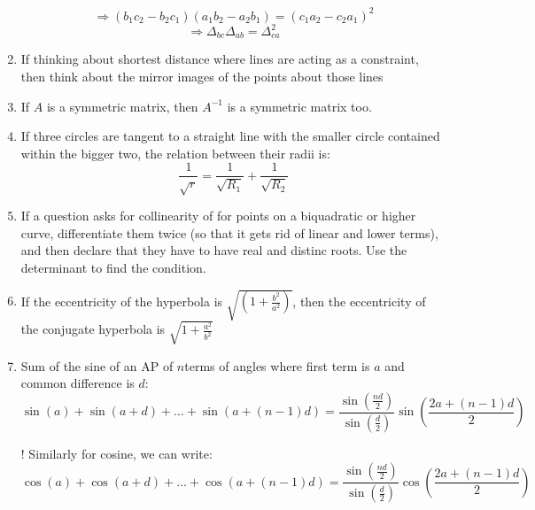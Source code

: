 \documentclass{article}
\numberwithin{equation}{section}
\numberwithin{figure}{section}
\begin{document}
\begin{enumerate}
\begin{equation}
			\end{equation}
			\begin{equation}
				\Rightarrow (b_1 c_2 - b_2 c_1)(a_1 b_2 - a_2 b_1)=(c_1 a_2 - c_2 a_1 )^2
			\end{equation}
			\begin{equation}
				\Rightarrow \boxed{\Delta_{bc} \Delta_{ab}=\Delta^2_{ca}}
			\end{equation}
		\item If thinking about shortest distance where lines are acting as a constraint, then think about the mirror images of the points about those lines			
		\item If $A$ is a symmetric matrix, then $A^{-1}$ is a symmetric matrix too.
		\item If three circles are tangent to a straight line with the smaller circle contained within the bigger two, the relation between their radii is:
			\begin{equation}
				\frac{1}{\sqrt{r}}=\frac{1}{\sqrt{R_1}}+\frac{1}{\sqrt{R_2}}
			\end{equation}
		\item If a question asks for collinearity of for points on a biquadratic or higher curve, differentiate them twice (so that it gets rid of linear and lower terms), and then declare that they have to have real and distinc roots. Use the determinant to find the condition.
		\item If the eccentricity of the hyperbola is $\sqrt{(1+\frac{b^2}{a^2})}$, then the eccentricity of the conjugate hyperbola is $\sqrt{1+\frac{a^2}{b^2}}$
		\item Sum of the sine of an AP of $n$terms of angles where first term is $a$ and common difference is $d$:
			\begin{equation}
				\sin(a)+\sin(a+d)+\dots + \sin(a+(n-1)d)=\frac{\sin(\frac{nd}{2})}{\sin(\frac{d}{2})}\sin(\frac{2a+(n-1)d}{2})		
			\end{equation}
		\item[!] Similarly for cosine, we can write:
			\begin{equation}
				\cos(a)+\cos(a+d)+\dots + \cos(a+(n-1)d)=\frac{\sin(\frac{nd}{2})}{\sin(\frac{d}{2})}\cos(\frac{2a+(n-1)d}{2})		
			\end{equation}


\end{enumerate}
\end{document}
